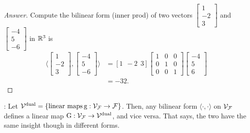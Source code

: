 \begin{proof}[Answer]
\noindent Compute the bilinear form (inner prod) of two vectors
%
$\begin{bmatrix}
        1 \\
        -2\\
        3
    \end{bmatrix}$ 
%
and 
%
$\begin{bmatrix}
        -4\\
        5\\
        -6
    \end{bmatrix}$
%
in $\mathbb{R}^3$ is 
%
\begin{align*}
    \langle 
    \begin{bmatrix}
        1 \\
        -2\\
        3
    \end{bmatrix},
    \begin{bmatrix}
        -4\\
        5\\
        -6
    \end{bmatrix} 
    \rangle 
    &= [1 ~\ -2 ~\ 3]
    \begin{bmatrix}
        1   &0  &0\\
        0   &1  &0\\
        0   &0  &1
    \end{bmatrix}
    \begin{bmatrix}
    -4\\ 
    5\\ 
    6
    \end{bmatrix}\\
&= -32.
\end{align*}
\end{proof}
\vspace{1cm}

\noindent {}: 
Let $\mathcal{V}^\textnormal{dual} = \{ \textnormal{linear maps} \operatorname{g}: \mathcal{V}_{\mathcal{F}} \to {\mathcal{F}} \}$.
Then, any bilinear form $\langle \cdot, \cdot \rangle$ on $\mathcal{V}_{\mathcal{F}}$ defines a linear map $\operatorname{G}: \mathcal{V}_{\mathcal{F}} \to \mathcal{V}^\textnormal{dual}$, and vice versa.
That says, the two have the same insight though in different forms.

